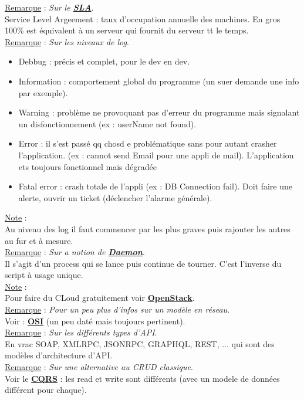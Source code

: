 \documentclass[a4paper,12pt,twoside]{article}
\newcommand{\urlcolor}{magenta}  %
\newcommand{\keycolor}{purple} %
\newcommand{\rem}[2]{\noindent\underline{Remarque} : \textit{#1}.\\ \indent #2}
\newcommand{\note}[1]{\noindent\underline{Note} : \\ \indent #1}
\newcommand{\keyref}[2]{\hypersetup{urlcolor=\keycolor} \href{#1}{\textbf{#2}}\hypersetup{urlcolor=\urlcolor}}
\begin{document}
\rem{Sur le \keyref{https://fr.wikipedia.org/wiki/Service-level_agreement}{SLA}}{Service Level Argeement : taux d'occupation annuelle des machines. En gros 100\% est équivalent à un serveur qui fournit du serveur tt le temps.}\\

\rem{Sur les niveaux de log}{\begin{itemize} 
\item Debbug : précis et complet, pour le dev en dev. 
\item Information : comportement global du programme (un suer demande une info par exemple).
\item Warning : problème ne provoquant pas d'erreur du programme mais signalant un disfonctionnement (ex : userName not found).
\item Error : il s'est passé qq chosd e problématique sans pour autant crasher l'application. (ex : cannot send Email pour une appli de mail). L'application ets toujours fonctionnel mais dégradée
\item Fatal error : crash totale de l'appli (ex : DB Connection fail). Doit faire une alerte, ouvrir un ticket (déclencher l'alarme générale).\\
\end{itemize}}

\note{Au niveau des log il faut commencer par les plus graves puis rajouter les autres au fur et à mesure.}\\

\rem{Sur a notion de \keyref{https://fr.wikipedia.org/wiki/Daemon_(informatique)}{Daemon}}{Il s'agit d'un process qui se lance puis continue de tourner. C'est l'inverse du script à usage unique.}\\

\note{Pour faire du CLoud gratuitement voir \keyref{https://fr.wikipedia.org/wiki/OpenStack}{OpenStack}.}\\

\rem{Pour un peu plus d'infos sur un modèle en réseau}{Voir : \keyref{https://fr.wikipedia.org/wiki/Mod\%C3\%A8le\_OSI}{OSI} (un peu daté mais toujours pertinent).}\\

\rem{Sur les différents types d'API}{En vrac SOAP, XMLRPC, JSONRPC, GRAPHQL, REST, ... qui sont des modèles d'architecture d'API.}\\

\rem{Sur une alternative au CRUD classique}{Voir le \keyref{https://docs.microsoft.com/fr-fr/azure/architecture/patterns/cqrs}{CQRS} : les read et write sont différents (avec un modele de données différent pour chaque).}\\
\end{document}
